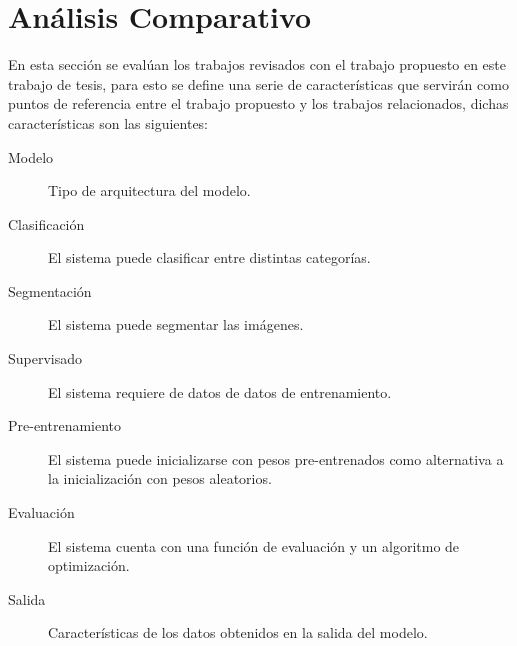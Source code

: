 \section{Análisis Comparativo}
En esta sección se evalúan los trabajos revisados con el trabajo propuesto en este trabajo de tesis, para esto se define una serie de características que servirán como puntos de referencia entre el trabajo propuesto y los trabajos relacionados, dichas características son las siguientes:

\begin{description}
    \item[Modelo]{Tipo de arquitectura del modelo.}
    \item[Clasificación]{El sistema puede clasificar entre distintas categorías.}
    \item[Segmentación]{El sistema puede segmentar las imágenes.}
    \item[Supervisado]{ El sistema requiere de datos de datos de entrenamiento.}
    \item[Pre-entrenamiento]{El sistema puede inicializarse con pesos pre-entrenados como alternativa a la inicialización con pesos aleatorios.}
    \item[Evaluación]{El sistema cuenta con una función de evaluación y un algoritmo de optimización.}
    \item[Salida]{Características de los datos obtenidos en la salida del modelo.}
\end{description}


